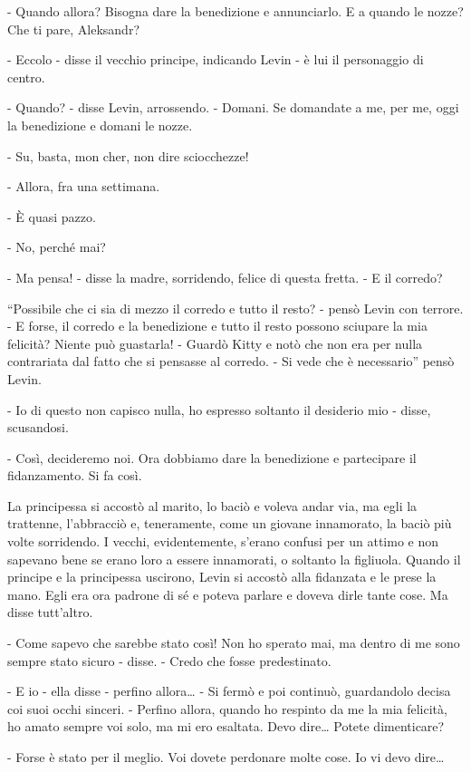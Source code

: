 - Quando allora? Bisogna dare la benedizione e annunciarlo. E a quando le nozze? Che ti pare, Aleksandr? 

- Eccolo - disse il vecchio principe, indicando Levin - è lui il personaggio di centro. 

- Quando? - disse Levin, arrossendo. - Domani. Se domandate a me, per me, oggi la benedizione e domani le nozze. 

- Su, basta, mon cher, non dire sciocchezze! 

- Allora, fra una settimana. 

- È quasi pazzo. 

- No, perché mai? 

- Ma pensa! - disse la madre, sorridendo, felice di questa fretta. - E il corredo? 

``Possibile che ci sia di mezzo il corredo e tutto il resto? - pensò Levin con terrore. - E forse, il corredo e la benedizione e tutto il resto possono sciupare la mia felicità? Niente può guastarla! - Guardò Kitty e notò che non era per nulla contrariata dal fatto che si pensasse al corredo. - Si vede che è necessario'' pensò Levin. 

- Io di questo non capisco nulla, ho espresso soltanto il desiderio mio - disse, scusandosi. 

- Così, decideremo noi. Ora dobbiamo dare la benedizione e partecipare il fidanzamento. Si fa così. 

La principessa si accostò al marito, lo baciò e voleva andar via, ma egli la trattenne, l'abbracciò e, teneramente, come un giovane innamorato, la baciò più volte sorridendo. I vecchi, evidentemente, s'erano confusi per un attimo e non sapevano bene se erano loro a essere innamorati, o soltanto la figliuola. Quando il principe e la principessa uscirono, Levin si accostò alla fidanzata e le prese la mano. Egli era ora padrone di sé e poteva parlare e doveva dirle tante cose. Ma disse tutt'altro. 

- Come sapevo che sarebbe stato così! Non ho sperato mai, ma dentro di me sono sempre stato sicuro - disse. - Credo che fosse predestinato. 

- E io - ella disse - perfino allora\ldots{} - Si fermò e poi continuò, guardandolo decisa coi suoi occhi sinceri. - Perfino allora, quando ho respinto da me la mia felicità, ho amato sempre voi solo, ma mi ero esaltata. Devo dire\ldots{} Potete dimenticare? 

- Forse è stato per il meglio. Voi dovete perdonare molte cose. Io vi devo dire\ldots{} 

